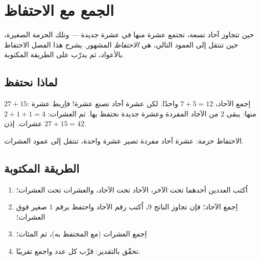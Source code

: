 \chapter{الجمع مع الاحتفاظ}\label{ch:g2:addition}

حين تتجاوز آحاد  تسعة، تجتمع عشرة منها في عشرة جديدة ---
وتلك الحزمة الصغيرة، حين تنتقل إلى العمود التالي، هي
\emph{الاحتفاظ} المشهور. يشرح هذا الفصل الاحتفاظ بالأعواد، ثم
يدرّب على الطريقة المكتوبة.

\section{لماذا نحتفظ}

\begin{example}\label{ex:g2:addition:bundle}
$27 + 15$: اِجمع الآحاد، $7 + 5 = 12$ واحدًا. لكن عشرة
آحاد تصنع عشرة! فاِربط عشرة منها: يبقى $2$ من الآحاد المفردة
وعشرة جديدة نحتفظ بها. ثم العشرات: $2 + 1 + 1 = 4$ عشرات. إذن
$27 + 15 = 42$.
\end{example}

\begin{omfigure}

{\small الاحتفاظ حزمة: عشرة آحاد مفردة تصير عشرة واحدة، تنتقل
إلى عمود العشرات.}
\end{omfigure}

\section{الطريقة المكتوبة}

\begin{method}\label{met:g2:addition:column}
\begin{enumerate}
  \item اُكتب العددين أحدهما تحت الآخر، الآحاد تحت الآحاد،
        والعشرات تحت العشرات؛
  \item اِجمع الآحاد؛ فإن تجاوز الناتج $9$، اُكتب رقم الآحاد
        واحتفظ برقم $1$ صغير فوق العشرات؛
  \item اِجمع العشرات (مع المحتفظ به)، ثم المئات؛
  \item تحقّق بالتقدير: قرِّب كل عدد واجمع تقريبًا.
\end{enumerate}
\end{method}

